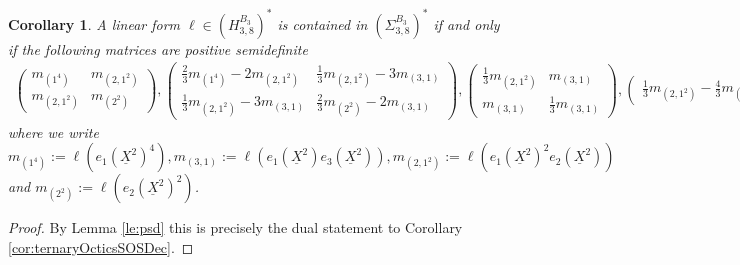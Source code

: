 \documentclass[11pt,a4paper]{amsart}
\numberwithin{equation}{section}
\newtheorem{cor}[thm]{Corollary}
\theoremstyle{definition}
\numberwithin{thm}{section}
\theoremstyle{break}
\numberwithin{subcase}{case}
\begin{document}
\begin{cor}\label{cor:ternaryOcticsDualToSOSDecomp}
A linear form $\ell \in \left( H_{3,8}^{B_3} \right)^\ast$ is contained in $\left( \Sigma_{3,8}^{B_3} \right)^\ast$ if and only if the following matrices are positive semidefinite
\begin{align*}
    \left( \begin{smallmatrix}
      m_{(1^4)}   & m_{(2,1^2)} \\
    m_{(2,1^2)}     & m_{(2^2)}
   \end{smallmatrix}\right), 
    \left( \begin{smallmatrix}
      \frac{2}{3}m_{(1^4)}-2m_{(2,1^2)}  & \frac{1}{3}m_{(2,1^2)}-3m_{(3,1)} \\
    \frac{1}{3}m_{(2,1^2)}-3m_{(3,1)}     & \frac{2}{3}m_{(2^2)}-2m_{(3,1)}
    \end{smallmatrix}\right), 
    \left( \begin{smallmatrix}
    \frac{1}{3}m_{(2,1^2)}     & m_{(3,1)} \\
    m_{(3,1)}     & \frac{1}{3}m_{(3,1)}
    \end{smallmatrix}\right), 
    \left( \begin{smallmatrix}\frac{1}{3}m_{(2,1^2)}-\frac{4}{3}m_{(2^2)}+m_{(3,1)}\end{smallmatrix} \right),
\end{align*}
where we write $m_{(1^4)} := \ell (e_1(\underline{X}^2)^4), m_{(3,1)} := \ell (e_1(\underline{X}^2)e_3(\underline{X}^2)), m_{(2,1^2)} := \ell (e_1(\underline{X}^2)^2e_2(\underline{X}^2))$ and $m_{(2^2)} := \ell (e_2(\underline{X}^2)^2)$.
\end{cor}
\begin{proof}
By Lemma \ref{le:psd} this is precisely the dual statement to Corollary \ref{cor:ternaryOcticsSOSDec}.
\end{proof}
\end{document}
